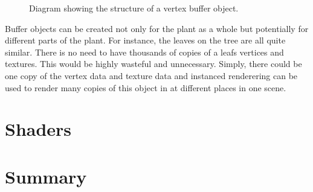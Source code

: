 \begin{figure}[htbp]
	{\centering
		\vspace{7px}
		\setlength{\fboxrule}{1pt}
		\caption{Diagram showing the structure of a vertex buffer object.}
	}
\end{figure}
\FloatBarrier

Buffer objects can be created not only for the plant as a whole but potentially for different parts of the plant. For instance, the leaves on the tree are all quite similar. There is no need to have thousands of copies of a leafs vertices and textures. This would be highly wasteful and unnecessary. Simply, there could be one copy of the vertex data and texture data and instanced renderering can be used to render many copies of this object in at different places in one scene. 

\section{Shaders}

\section{Summary}








